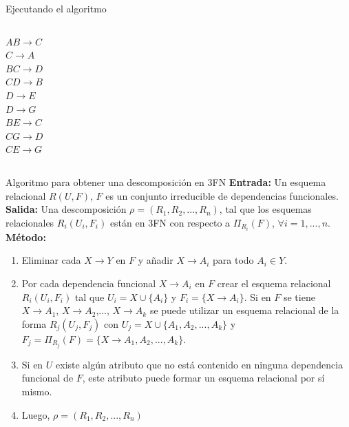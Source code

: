 \begin{frame}{Ejecutando el algoritmo}
\begin{columns}[T]
\begin{column}{0.25\linewidth}
{            $AB \to C$\\
            $C \to A$\\
            $BC \to D$\\
            $CD \to B$\\
            $D \to E$\\
            $D \to G$\\
            $BE \to C$\\
            $CG \to D$\\
            $CE \to G$
        }
        \end{column}

    \end{columns}
    \vspace{5mm}

    \centering

    
\end{frame}

\begin{frame}{Algoritmo para obtener una descomposici\'on en 3FN}
    \textbf{Entrada:} Un esquema relacional $R(U,F)$, $F$ es un conjunto irreducible de dependencias funcionales.\\
    \textbf{Salida:} Una descomposici\'on $\rho = (R_1,R_2,...,R_n)$, tal que
    los esquemas relacionales $R_i(U_i,F_i)$ est\'an en 3FN con respecto
    a $\Pi_{R_i}(F)$, $\forall i = 1,...,n$.\\
    \textbf{M\'etodo:}\begin{enumerate}
        \item Eliminar cada $X \to Y$ en $F$ y a\~nadir $X \to A_i$ para todo $A_i \in Y$.
        \item Por cada dependencia funcional $X \to A_i$ en $F$ crear el esquema
        relacional $R_i(U_i,F_i)$ tal que $U_i = X \cup \{A_i\}$ y $F_i = \{X \to A_i\}$. Si en $F$ se tiene \\$X \to A_1$, $X \to A_2$,..., $X \to A_k$ se puede
        utilizar un esquema relacional de la forma $R_j(U_j,F_j)$ con
        $U_j = X \cup \{A_1,A_2,...,A_k\}$ y $F_j = \Pi_{R_j}(F)= \{X \to A_1, A_2,...,A_k\}$.
        \item Si en $U$ existe alg\'un atributo que no est\'a contenido en ninguna dependencia
        funcional de $F$, este atributo puede formar un esquema relacional por s\'i mismo.
        \item Luego, $\rho = (R_1,R_2,...,R_n)$
    \end{enumerate}

\end{frame}

